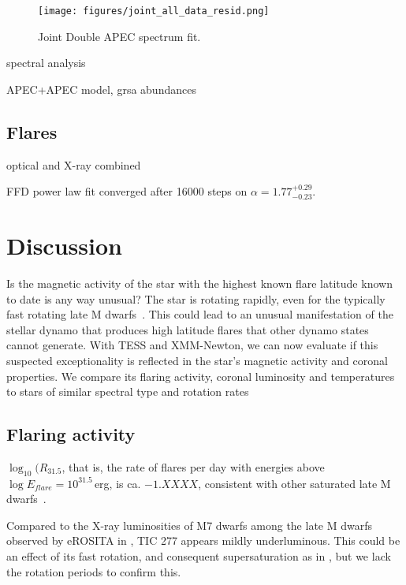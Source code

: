 \documentclass[twocolumn]{aastex631}
\begin{document}
\begin{figure}
    \begin{centering}
        \texttt{[image: figures/joint\_all\_data\_resid.png]}
        \caption{
         Joint Double APEC spectrum fit.
        }
        \label{fig:spec_joint_all}
    \end{centering}
\end{figure}


spectral analysis

APEC+APEC model, grsa abundances

\subsection{Flares}

optical and X-ray combined

FFD power law fit converged after 16000 steps on $\alpha = 1.77_{-0.23}^{+0.29}$.


\section{Discussion}
\label{sec:discussion}

Is the magnetic activity of the star with the highest known flare latitude known to date is any way unusual? The star is rotating rapidly, even for the typically fast rotating late M dwarfs~\citep{medina2022galactic}. This could lead to an unusual manifestation of the stellar dynamo that produces high latitude flares that other dynamo states cannot generate. With TESS and XMM-Newton, we can now evaluate if this suspected exceptionality is reflected in the star's magnetic activity and coronal properties. We compare its flaring activity, coronal luminosity and temperatures to stars of similar spectral type and rotation rates

\subsection{Flaring activity}
\label{sec:discussion:flares}

$\log_10(R_{31.5}$, that is, the rate of flares per day with energies above $\log E_{flare}=10^{31.5}\,$erg, is ca. $-1.XXXX$, consistent with other saturated late M dwarfs~\citep{medina2022galactic}.

Compared to the X-ray luminosities of M7 dwarfs among the late M dwarfs observed by eROSITA in \citet{stelzer2022first}, TIC 277 appears mildly underluminous. This could be an effect of its fast rotation, and consequent supersaturation as in \citet{magaudda2022first}, but we lack the rotation periods to confirm this. 
\end{document}
